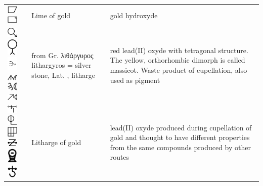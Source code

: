 \documentclass[british,final,landscape]{scrartcl}
\begin{document}
\begin{refsection}
\begin{supertabular}{p{0.3\textwidth}p{0.34\textwidth}p{0.34\textwidth}}
   \includegraphics[width=5mm]{Compounds/LimeOfGold} \includegraphics[width=5mm]{Compounds/LimeOfGold2} & Lime of gold & gold hydroxyde \\
   \includegraphics[width=5mm]{Compounds/Litharge} \includegraphics[width=5mm]{Compounds/Litharge2} \includegraphics[width=5mm]{Compounds/Litharge3} \includegraphics[width=5mm]{Compounds/Litharge4} \includegraphics[width=5mm]{Compounds/Litharge5} \includegraphics[width=5mm]{Compounds/Litharge6} & from Gr. \foreignlanguage{greek}{λιθάργυρος} lithargyros = silver stone, Lat. , litharge & red lead(II) oxyde  with tetragonal structure. The yellow, orthorhombic dimorph is called massicot. Waste product of cupellation, also used as pigment \\
   \includegraphics[width=5mm]{Compounds/LithargeOfGold} \includegraphics[width=5mm]{Compounds/LithargeOfGold2} \includegraphics[width=5mm]{Compounds/LithargeOfGold3} \includegraphics[width=5mm]{Compounds/GoldLitharge} \includegraphics[width=5mm]{Compounds/GoldLitharge2} \includegraphics[width=5mm]{Compounds/GoldLitharge3} & Litharge of gold & lead(II) oxyde produced during cupellation of gold and thought to have different properties from the same compounds produced by other routes \\

\end{supertabular}
\end{refsection}
\end{document}
